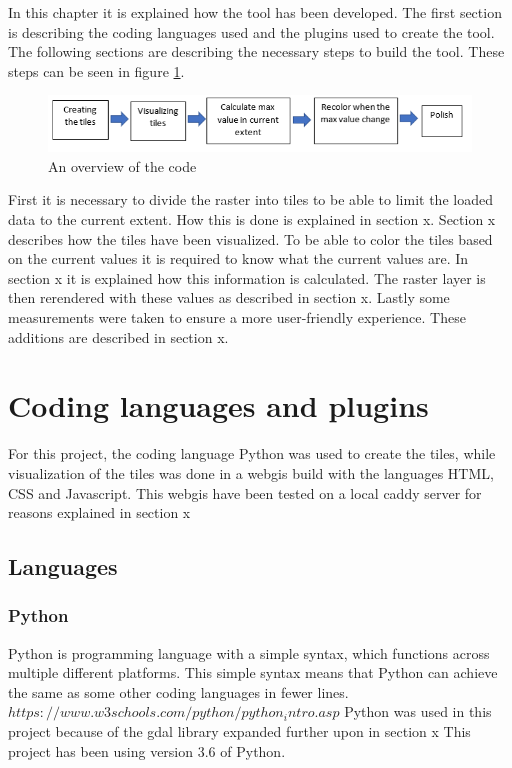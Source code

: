 In this chapter it is explained how the tool has been developed. The first section is describing the coding languages used and the plugins used to create the tool. The following sections are describing the necessary steps to build the tool. These steps can be seen in figure \ref{DevelopmentSteps}.

\begin{figure} [H]
	\centering
	\includegraphics[width=.8\textwidth]{Pictures/DevelopmentSteps}
	\caption{An overview of the code}
	\label{DevelopmentSteps}
\end{figure}

First it is necessary to divide the raster into tiles to be able to limit the loaded data to the current extent. How this is done is explained in section x. Section x describes how the tiles have been visualized. To be able to color the tiles based on the current values it is required to know what the current values are. In section x it is explained how this information is calculated. The raster layer is then rerendered with these values as described in section x. Lastly some measurements were taken to ensure a more user-friendly experience. These additions are described in section x. 

\chapter{Coding languages and plugins}
For this project, the coding language Python was used to create the tiles, while visualization of the tiles was done in a webgis build with the languages HTML, CSS and Javascript. This webgis have been tested on a local caddy server for reasons explained in section x

\section{Languages}
\subsection*{Python}
Python is programming language with a simple syntax, which functions across multiple different platforms. This simple syntax means that Python can achieve the same as some other coding languages in fewer lines. $https://www.w3schools.com/python/python_intro.asp$
Python was used in this project because of the gdal library expanded further upon in section x
This project has been using version 3.6 of Python. 
